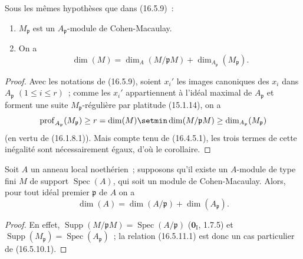 \begin{corollary}[16.5.10]
\label{0.16.5.10-fr}
Sous les mêmes hypothèses que dans \textup{(16.5.9)}~:
\begin{enumerate}
  \item[\textup{(i)}] $M_{\mathfrak{p}}$ est un $A_{\mathfrak{p}}$-module de
  Cohen-Macaulay.
  \item[\textup{(ii)}] On a
  \begin{equation}
  \label{0.16.5.10.1-fr}
  \tag{16.5.10.1}
    \dim(M)=\dim_A(M/\mathfrak{p}M)
    +\dim_{A_{\mathfrak{p}}}(M_{\mathfrak{p}}).
  \end{equation}
\end{enumerate}
\end{corollary}

\begin{proof}
Avec les notations de (16.5.9), soient $x_i'$ les images canoniques des $x_i$
dans $A_{\mathfrak{p}}$ $(1\leq i\leq r)$~; comme les $x_i'$ appartiennent à
l'idéal maximal de $A_{\mathfrak{p}}$ et forment une suite
$M_{\mathfrak{p}}$-régulière par platitude (15.1.14), on a
\[
  \operatorname{prof}_{A_{\mathfrak{p}}}(M_{\mathfrak{p}})
  \geq r=\dim(M)\setmin\dim(M/\mathfrak{p}M)
  \geq\dim_{A_{\mathfrak{p}}}(M_{\mathfrak{p}})
\]
(en vertu de (16.1.8.1)). Mais compte tenu de (16.4.5.1), les trois termes de
cette inégalité sont nécessairement égaux, d'où le corollaire.
\end{proof}


\begin{corollary}[16.5.11]
\label{0.16.5.11-fr}
Soit $A$ un anneau local noethérien~; supposons qu'il existe un $A$-module de
type fini $M$ de support $\operatorname{Spec}(A)$, qui soit un module de
Cohen-Macaulay. Alors, pour tout idéal premier $\mathfrak{p}$ de $A$ on a
\begin{equation}
\label{0.16.5.11.1-fr}
\tag{16.5.11.1}
  \dim(A)=\dim(A/\mathfrak{p})+\dim(A_{\mathfrak{p}}).
\end{equation}
\end{corollary}

\begin{proof}
En effet, $\operatorname{Supp}(M/\mathfrak{p}M)
=\operatorname{Spec}(A/\mathfrak{p})$ ($\mathbf{0}_{\mathrm I}$, 1.7.5) et
$\operatorname{Supp}(M_{\mathfrak{p}})
=\operatorname{Spec}(A_{\mathfrak{p}})$~; la relation (16.5.11.1) est donc un
cas particulier de (16.5.10.1).
\end{proof}

